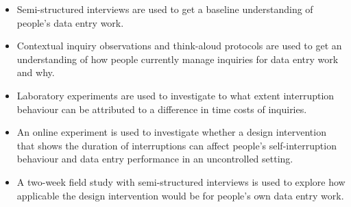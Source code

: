 \begin{itemize}
\item Semi-structured interviews are used to get a baseline understanding of people's data entry work.
\item Contextual inquiry observations and think-aloud protocols are used to get an understanding of how people currently manage inquiries for data entry work and why. 
\item Laboratory experiments are used to investigate to what extent interruption behaviour can be attributed to a difference in time costs of inquiries. 
\item An online experiment is used to investigate whether a design intervention that shows the duration of interruptions can affect people's self-interruption behaviour and data entry performance in an uncontrolled setting. 
\item A two-week field study with semi-structured interviews is used to explore how applicable the design intervention would be for people's own data entry work. 
\end{itemize}



